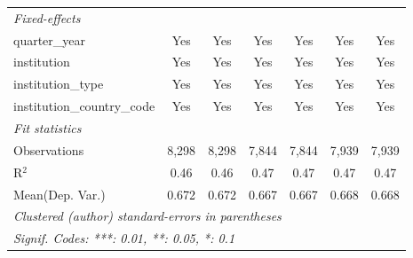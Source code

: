 \begin{tabular}{lcccccc}
   \midrule
   \emph{Fixed-effects}\\
   quarter\_year                      & Yes     & Yes      & Yes     & Yes         & Yes     & Yes\\  
   institution                        & Yes     & Yes      & Yes     & Yes         & Yes     & Yes\\  
   institution\_type                  & Yes     & Yes      & Yes     & Yes         & Yes     & Yes\\  
   institution\_country\_code         & Yes     & Yes      & Yes     & Yes         & Yes     & Yes\\  
   \midrule
   \emph{Fit statistics}\\
   Observations                       & 8,298   & 8,298    & 7,844   & 7,844       & 7,939   & 7,939\\  
   R$^2$                              & 0.46    & 0.46     & 0.47    & 0.47        & 0.47    & 0.47\\  
Mean(Dep. Var.) & 0.672 & 0.672 & 0.667 & 0.667 & 0.668 & 0.668 \\
   \midrule \midrule
   \multicolumn{7}{l}{\emph{Clustered (author) standard-errors in parentheses}}\\
   \multicolumn{7}{l}{\emph{Signif. Codes: ***: 0.01, **: 0.05, *: 0.1}}\\
\end{tabular}
\par\endgroup
